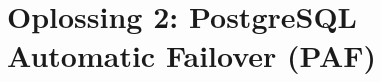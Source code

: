 
\chapter{Oplossing 2: PostgreSQL Automatic Failover (PAF)}

\label{ch:Oplossing 2: PostgreSQL Automatic Failover}

\section{}
\label{sec:Redundantie/Replicatie}

\section{}
\label{sec:Failover}

\section{}
\label{sec:Monitoring}
